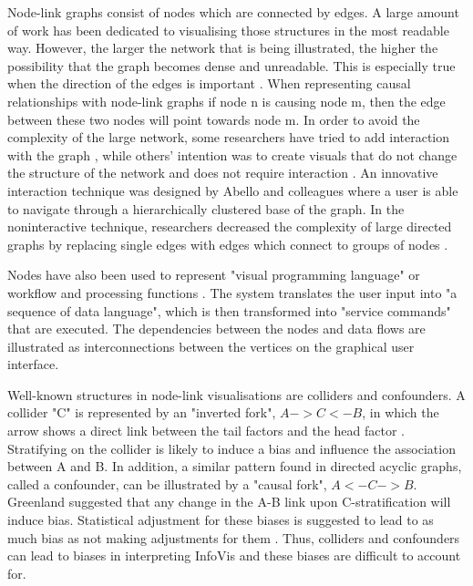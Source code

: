 \documentclass{l4proj}
\begin{document}
Node-link graphs consist of nodes which are connected by edges. A large amount of work has been dedicated to visualising those structures in the most readable way. However, the larger the network that is being illustrated, the higher the possibility that the graph becomes dense and unreadable. This is especially true when the direction of the edges is important \cite{dwyer2013edge}. When representing causal relationships with node-link graphs if node n is causing node m, then the edge between these two nodes will point towards node m. In order to avoid the complexity of the large network, some researchers have tried to add interaction with the graph \cite{gansner2005topological}, while others' intention was to create visuals that do not change the structure of the network and does not require interaction \cite{dwyer2013edge}. An innovative interaction technique was designed by Abello and colleagues \cite{abello2006ask} where a user is able to navigate through a hierarchically clustered base of the graph. In the noninteractive technique, researchers decreased the complexity of large directed graphs by replacing single edges with edges which connect to groups of nodes \cite{dwyer2013edge}.  

Nodes have also been used to represent "visual programming language" or workflow and processing functions \cite{thattai2016systems}. The system translates the user input into "a sequence of data language", which is then transformed into "service commands" that are executed. The dependencies between the nodes and data flows are illustrated as interconnections between the vertices on the graphical user interface. 

Well-known structures in node-link visualisations are colliders and confounders. A collider "C" is represented by an "inverted fork", $A->C<-B$, in which the arrow shows a direct link between the tail factors and the head factor \cite{greenland2003quantifying}. Stratifying on the collider is likely to induce a bias and influence the association between A and B. In addition, a similar pattern found in directed acyclic graphs, called a confounder, can be illustrated by a "causal fork", $A<-C-> B$. Greenland \cite{greenland2003quantifying} suggested that any change in the A-B link upon C-stratification will induce bias. Statistical adjustment for these biases is suggested to lead to as much bias as not making adjustments for them \cite{janszky2010janus}. Thus, colliders and confounders can lead to biases in interpreting InfoVis and these biases are difficult to account for.
\end{document}

